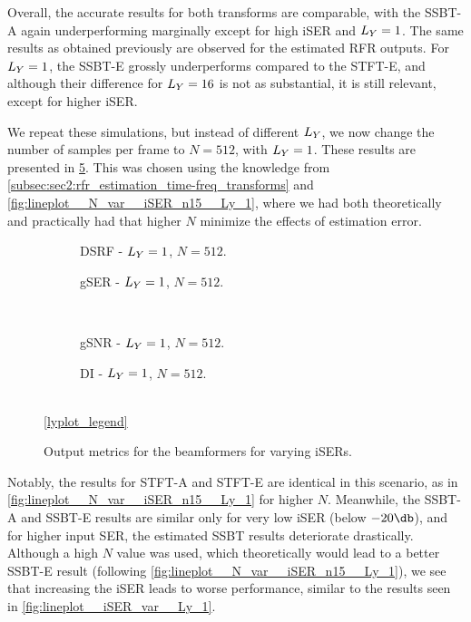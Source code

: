 Overall, the accurate results for both transforms are comparable, with the SSBT-A again underperforming marginally except for high iSER and $\Ly = 1$. The same results as obtained previously are observed for the estimated RFR outputs. For $\Ly = 1$, the SSBT-E grossly underperforms compared to the STFT-E, and although their difference for $\Ly = 16$ is not as substantial, it is still relevant, except for higher iSER.

We repeat these simulations, but instead of different $\Ly$, we now change the number of samples per frame to $N = 512$, with $\Ly = 1$. These results are presented in \cref{fig:lineplot__N_512__iSER_var__Ly_1}. This was chosen using the knowledge from \cref{subsec:sec2:rfr_estimation_time-freq_transforms} and \cref{fig:lineplot__N_var__iSER_n15__Ly_1}, where we had both theoretically and practically had that higher $N$ minimize the effects of estimation error.
\begin{figure}[!ht]
	\centering
	\begin{subfigure}{0.49\textwidth}
		\centering
		
		\caption{DSRF - $\Ly = 1$, $N = 512$.}
		\label{subfig:lineplot__DSRF__N_512__iSER_var__Ly_1}
	\end{subfigure}\hfill
	\begin{subfigure}{0.49\textwidth}
		\centering
		
		\caption{gSER - $\Ly = 1$, $N = 512$.}
		\label{subfig:lineplot__gSER__N_512__iSER_var__Ly_1}
	\end{subfigure}\\[1em]
	\begin{subfigure}{0.49\textwidth}
		\centering
		
		\caption{gSNR - $\Ly = 1$, $N = 512$.}
		\label{subfig:lineplot__gSNR__N_512__iSER_var__Ly_1}
	\end{subfigure}\hfill
	\begin{subfigure}{0.49\textwidth}
		\centering
		
		\caption{DI - $\Ly = 1$, $N = 512$.}
		\label{subfig:lineplot__DI__N_512__iSER_var__Ly_1}
	\end{subfigure}\\[1em]
	\ref*{lyplot_legend}
	\caption{Output metrics for the beamformers for varying iSERs.}
	\label{fig:lineplot__N_512__iSER_var__Ly_1}
\end{figure}
Notably, the results for STFT-A and STFT-E are identical in this scenario, as in \cref{fig:lineplot__N_var__iSER_n15__Ly_1} for higher $N$. Meanwhile, the SSBT-A and SSBT-E results are similar only for very low iSER (below $-20\dB$), and for higher input SER, the estimated SSBT results deteriorate drastically. Although a high $N$ value was used, which theoretically would lead to a better SSBT-E result (following \cref{fig:lineplot__N_var__iSER_n15__Ly_1}), we see that increasing the iSER leads to worse performance, similar to the results seen in \cref{fig:lineplot__iSER_var__Ly_1}.

